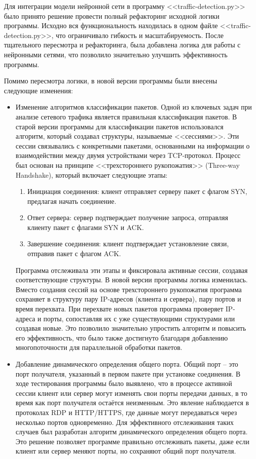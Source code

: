 \documentclass[bachelor, och, coursework]{SCWorks}
\begin{document}
Для интеграции модели нейронной сети в программу <<traffic-detection.py>> было принято решение провести полный рефакторинг исходной логики программы. 
Исходно вся функциональность находилась в одном файле <<traffic-detection.py>>, что ограничивало гибкость и масштабируемость. После тщательного 
пересмотра и рефакторинга, была добавлена логика для работы с нейронными сетями, что позволило значительно улучшить эффективность программы.

Помимо пересмотра логики, в новой версии программы были внесены следующие изменения:

\begin{itemize}
  \item Изменение алгоритмов классификации пакетов. Одной из ключевых задач при анализе сетевого трафика является правильная 
  классификация пакетов. В старой версии программы для классификации пакетов использовался алгоритм, который создавал структуры, называемые <<сессиями>>. 
  Эти сессии связывались с конкретными пакетами, основанными на информации о взаимодействии между двумя устройствами через TCP-протокол. Процесс был 
  основан на принципе <<трехстороннего рукопожатия>> (Three-way Handshake), который включает следующие этапы:
  \begin{enumerate}
    \item Инициация соединения: клиент отправляет серверу пакет с флагом SYN, предлагая начать соединение.
    \item Ответ сервера: сервер подтверждает получение запроса, отправляя клиенту пакет с флагами SYN и ACK.
    \item Завершение соединения: клиент подтверждает установление связи, отправив пакет с флагом ACK.
  \end{enumerate}

  Программа отслеживала эти этапы и фиксировала активные сессии, создавая соответствующие структуры. В новой версии программы логика изменилась. 
  Вместо создания сессий на основе трехстороннего рукопожатия программа сохраняет в структуру пару IP-адресов (клиента и сервера), пару портов и время 
  перехвата. При перехвате новых пакетов программа проверяет IP-адреса и порты, сопоставляя их с уже существующими структурами или создавая новые. Это 
  позволило значительно упростить алгоритм и повысить его эффективность, что было также достигнуто благодаря добавлению многопоточности для параллельной 
  обработки пакетов.

  \item Добавление динамического определения общего порта. Общий порт -- это порт получателя, указанный в первом пакете при установке соединения. 
  В ходе тестирования программы было выявлено, что в процессе активной сессии клиент или сервер могут изменять свои порты передачи данных, в то время как 
  порт получателя остаётся неизменным. Это явление наблюдается в протоколах RDP и HTTP/HTTPS, где данные могут передаваться через несколько портов 
  одновременно. Для эффективного отслеживания таких случаев был разработан алгоритм динамического определения общего порта. Это решение позволяет 
  программе правильно отслеживать пакеты, даже если клиент или сервер меняют порты, но сохраняют общий порт получателя.


\end{itemize}
\end{document}
